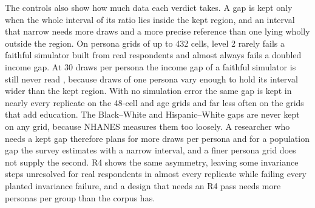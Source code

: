 The controls also show how much data each verdict takes.
A gap is kept only when the whole interval of its ratio lies inside the kept region, and an interval that narrow needs more draws and a more precise reference than one lying wholly outside the region.
On persona grids of up to 432 cells, level 2 rarely fails a faithful simulator built from real respondents and almost always fails a doubled income gap. %
At 30 draws per persona the income gap of a faithful simulator is still never read , because draws of one persona vary enough to hold its interval wider than the kept region. %
With no simulation error the same gap is kept in nearly every replicate on the 48-cell and age grids and far less often on the grids that add education.
The Black--White and Hispanic--White gaps are never kept on any grid, because NHANES measures them too loosely. %
A researcher who needs a kept gap therefore plans for more draws per persona and for a population gap the survey estimates with a narrow interval, and a finer persona grid does not supply the second.
R4 shows the same asymmetry, leaving some invariance steps unresolved for real respondents in almost every replicate while failing every planted invariance failure, and a design that needs an R4 pass needs more personas per group than the corpus has. %
